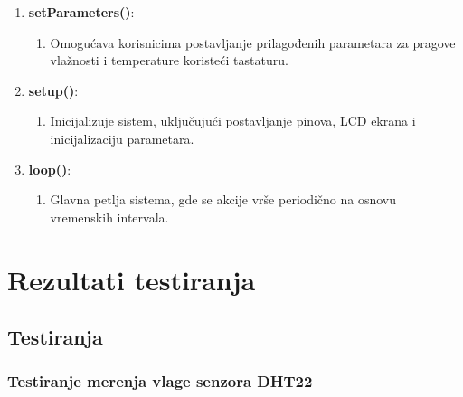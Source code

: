 \documentclass[a4paper, 12pt]{article}
\begin{document}
\begin{enumerate}[label=\arabic*.,leftmargin=*]
    \item \textbf{setParameters()}:
        \begin{enumerate}[label={},leftmargin=*] 
            \item Omogućava korisnicima postavljanje prilagođenih parametara za pragove vlažnosti i temperature koristeći tastaturu.
        \end{enumerate}
        
    \item \textbf{setup()}:
        \begin{enumerate}[label={},leftmargin=*] 
            \item Inicijalizuje sistem, uključujući postavljanje pinova, LCD ekrana i inicijalizaciju parametara.
        \end{enumerate}
        
    \item \textbf{loop()}:
        \begin{enumerate}[label={},leftmargin=*] 
            \item Glavna petlja sistema, gde se akcije vrše periodično na osnovu vremenskih intervala.
        \end{enumerate}
\end{enumerate}

\pagebreak
\endgroup

\section{Rezultati testiranja}

\vspace{10pt}

	\subsection{Testiranja}


\vspace{10pt}

		\subsubsection*{Testiranje merenja vlage senzora DHT22}
		
\end{document}
